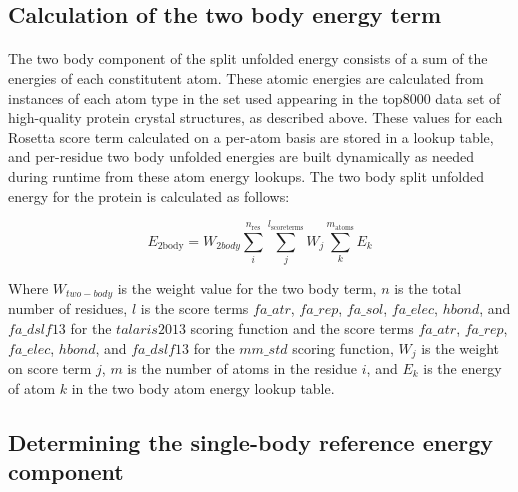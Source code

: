 \subsection{Calculation of the two body energy term}
\paragraph{}
The two body component of the split unfolded energy consists of a sum of the energies of each constitutent atom.
These atomic energies are calculated from instances of each atom type in the set used appearing in the top8000 data set of high-quality protein crystal structures, as described above.
These values for each Rosetta score term calculated on a per-atom basis are stored in a lookup table, and per-residue two body unfolded energies are built dynamically as needed during runtime from these atom energy lookups.
The two body split unfolded energy for the protein is calculated as follows:

\begin{equation}
E_{\text{2body}} = W_{2body} \sum_{i}^{n_{\text{res}}} \sum_{j}^{l_{\text{scoreterms}}} W_{j} \sum_{k}^{m_{\text{atoms}}} E_{k}
\end{equation}

Where $W_{two-body}$ is the weight value for the two body term, $n$ is the total number of residues, $l$ is the score terms $fa\_atr$, $fa\_rep$, $fa\_sol$, $fa\_elec$, $hbond$, and $fa\_dslf13$ for the $talaris2013$ scoring function and the score terms $fa\_atr$, $fa\_rep$, $fa\_elec$, $hbond$, and $fa\_dslf13$ for the $mm\_std$ scoring function, $W_{j}$ is the weight on score term $j$, $m$ is the number of atoms in the residue $i$, and $E_{k}$ is the energy of atom $k$ in the two body atom energy lookup table.


\subsection{Determining the single-body reference energy component}
